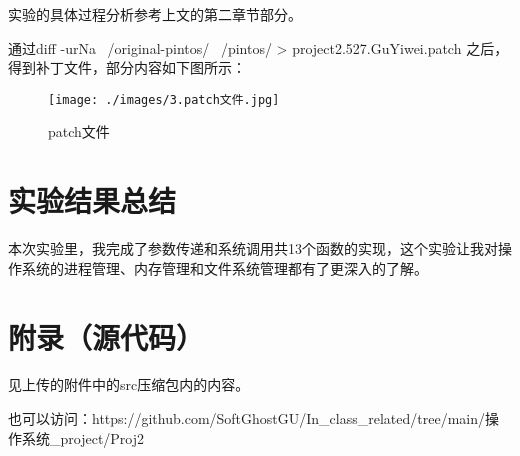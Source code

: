 \documentclass{article}
\begin{document}
	实验的具体过程分析参考上文的第二章节部分。
	
	通过diff -urNa ~/original-pintos/ ~/pintos/ > project2.527.GuYiwei.patch 之后，得到补丁文件，部分内容如下图所示：
	
	\begin{figure}[h]
		\centering
		\texttt{[image: ./images/3.patch文件.jpg]}
		\caption{patch文件}
		\label{fig:graph3}
	\end{figure}
	
	\section{实验结果总结}
	
	本次实验里，我完成了参数传递和系统调用共13个函数的实现，这个实验让我对操作系统的进程管理、内存管理和文件系统管理都有了更深入的了解。
	
	\section{附录（源代码）}
	
	见上传的附件中的src压缩包内的内容。
	
	也可以访问：https://github.com/SoftGhostGU/In\_class\_related/tree/main/操作系统\_project/Proj2
\end{document}
